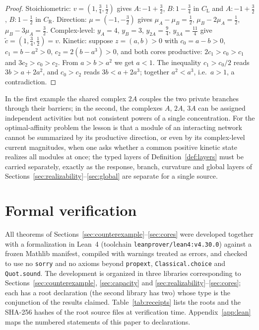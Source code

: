 \documentclass[11pt,reqno]{amsart}
\theoremstyle{plain}
\theoremstyle{definition}
\theoremstyle{remark}
\numberwithin{equation}{section}
\begin{document}
\begin{proof}
Stoichiometric: $v=(1,\tfrac34,\tfrac12)$ gives $A\colon-1+\tfrac32$, $B\colon1-\tfrac34$ in $C_{\mathrm L}$ and $A\colon-1+\tfrac32$, $B\colon1-\tfrac12$ in $C_{\mathrm R}$.  Direction: $\mu=(-1,-\tfrac32)$ gives $\mu_A-\mu_B=\tfrac12$, $\mu_B-2\mu_A=\tfrac12$, $\mu_B-3\mu_A=\tfrac32$.  Complex-level: $y_A=4$, $y_B=3$, $y_{2A}=\tfrac94$, $y_{3A}=\tfrac{11}4$ give $\tilde c=(1,\tfrac34,\tfrac12)=v$.  Kinetic: suppose $z=(a,b)>0$ with $c_0=a-b>0$, $c_1=b-a^2>0$, $c_2=2(b-a^3)>0$, and both cores productive: $2c_1>c_0>c_1$ and $3c_2>c_0>c_2$.  From $a>b>a^2$ we get $a<1$.  The inequality $c_1>c_0/2$ reads $3b>a+2a^2$, and $c_0>c_2$ reads $3b<a+2a^3$; together $a^2<a^3$, i.e.\ $a>1$, a contradiction.
\end{proof}

In the first example the shared complex $2A$ couples the two private branches through their barriers; in the second, the complexes $A$, $2A$, $3A$ can be assigned independent activities but not consistent powers of a single concentration.  For the optimal-affinity problem the lesson is that a module of an interacting network cannot be summarized by its productive direction, or even by its complex-level current magnitudes, when one asks whether a common positive kinetic state realizes all modules at once; the typed layers of Definition~\ref{def:layers} must be carried separately, exactly as the response, branch, curvature and global layers of Sections~\ref{sec:realizability}--\ref{sec:global} are separate for a single source.

\section{Formal verification}\label{sec:formal}

All theorems of Sections~\ref{sec:counterexample}--\ref{sec:cores} were developed together with a formalization in Lean~4 (toolchain \texttt{leanprover/lean4:v4.30.0}) against a frozen Mathlib manifest, compiled with warnings treated as errors, and checked to use no \texttt{sorry} and no axioms beyond \texttt{propext}, \texttt{Classical.choice} and \texttt{Quot.sound}.  The development is organized in three libraries corresponding to Sections~\ref{sec:counterexample}, \ref{sec:capacity} and \ref{sec:realizability}--\ref{sec:cores}; each has a root declaration (the second library has two) whose type is the conjunction of the results claimed.  Table~\ref{tab:receipts} lists the roots and the SHA-256 hashes of the root source files at verification time.  Appendix~\ref{app:lean} maps the numbered statements of this paper to declarations.
\end{document}
